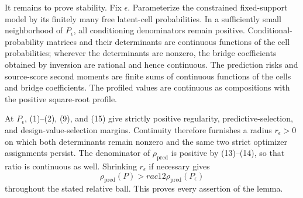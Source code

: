 It remains to prove stability.  Fix \(\epsilon\).  Parameterize the constrained fixed-support model by its finitely many free latent-cell probabilities.  In a sufficiently small neighborhood of \(P_\epsilon\), all conditioning denominators remain positive.  Conditional-probability matrices and their determinants are continuous functions of the cell probabilities; wherever the determinants are nonzero, the bridge coefficients obtained by inversion are rational and hence continuous.  The prediction risks and source-score second moments are finite sums of continuous functions of the cells and bridge coefficients.  The profiled values are continuous as compositions with the positive square-root profile.

At \(P_\epsilon\), (1)--(2), (9), and (15) give strictly positive regularity, predictive-selection, and design-value-selection margins.  Continuity therefore furnishes a radius \(r_\epsilon>0\) on which both determinants remain nonzero and the same two strict optimizer assignments persist.  The denominator of \(\rho_{\mathrm{pred}}\) is positive by (13)--(14), so that ratio is continuous as well.  Shrinking \(r_\epsilon\) if necessary gives
\[
 \rho_{\mathrm{pred}}(P)>rac12\rho_{\mathrm{pred}}(P_\epsilon)
\]
throughout the stated relative ball.  This proves every assertion of the lemma.